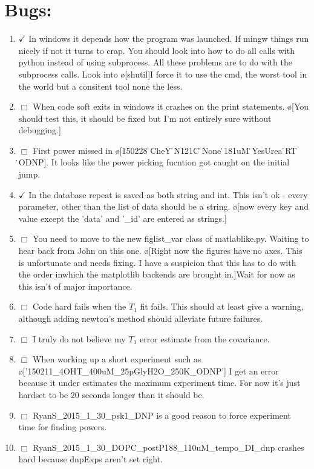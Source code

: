 \documentclass[10pt]{book}
\begin{document}
\section{Bugs:}
\begin{enumerate}
    \item $\checkmark$ In windows it depends how the program was launched. If mingw things run nicely if not it turns to crap. You should look into how to do all calls with python instead of using subprocess. All these problems are to do with the subprocess calls. Look into \o[shutil]{I force it to use the cmd, the worst tool in the world but a consitent tool none the less.}
    \item $\Box$ When code soft exits in windows it crashes on the print statements. \o[You should test this, it should be fixed but I'm not entirely sure without debugging.]{}
    \item $\Box$ First power missed in \o[150228 ̇CheY ̇N121C ̇None ̇181uM ̇YesUrea ̇RT ̇ODNP]{}. It looks like the power picking fucntion got caught on the initial jump.
    \item $\checkmark$ In the database repeat is saved as both string and int. This isn't ok - every parameter, other than the list of data should be a string. \o[now every key and value except the 'data' and '\_id' are entered as strings.]{}
    \item $\Box$ You need to move to the new figlist\_var class of matlablike.py. Waiting to hear back from John on this one. \o[Right now the figures have no axes. This is unfortunate and needs fixing. I have a suspicion that this has to do with the order inwhich the matplotlib backends are brought in.]{Wait for now as this isn't of major importance.}
    \item $\Box$ Code hard fails when the $T_1$ fit fails. This should at least give a warning, although adding newton's method should alleviate future failures.
    \item $\Box$ I truly do not believe my $T_1$ error estimate from the covariance.
    \item $\Box$ When working up a short experiment such as \o['150211_4OHT_400uM_25pGlyH2O_250K_ODNP']{} I get an error because it under estimates the maximum experiment time. For now it's just hardset to be 20 seconds longer than it should be.
    \item $\Box$ RyanS_2015_1_30_psk1_DNP is a good reason to force experiment time for finding powers.
    \item $\Box$ RyanS_2015_1_30_DOPC_postP188_110uM_tempo_DI_dnp crashes hard because dnpExps aren't set right. 

\end{enumerate}
\end{document}
